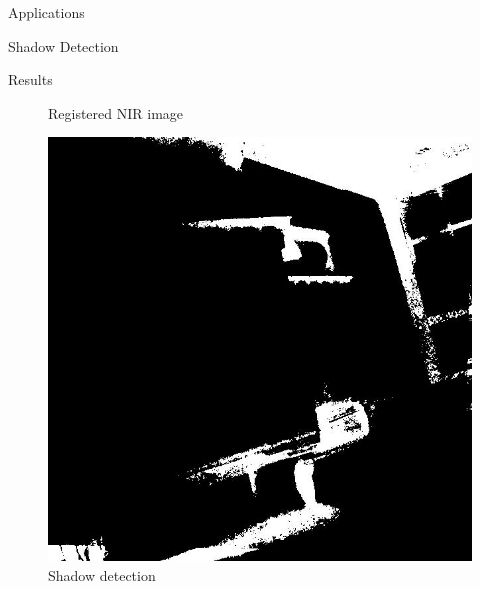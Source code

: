\documentclass[10pt]{article}
\begin{document}
\begin{section}{Applications}
\begin{subsection}{Shadow Detection}
\begin{subsubsection}{Results}
\begin{figure}[!h]
\begin{minipage}[b]{0.32\textwidth}
                    \caption{Registered NIR image}
                \end{minipage} \hspace{0.1em} %
                \begin{minipage}[b]{0.32\textwidth}
                    \includegraphics[width=\textwidth]{fig/shadow_detection/shadow_detection.jpg}
                    \caption{Shadow detection}
                \end{minipage}
            \end{figure}


        \end{subsubsection}

    \end{subsection}

\end{section}
\end{document}
